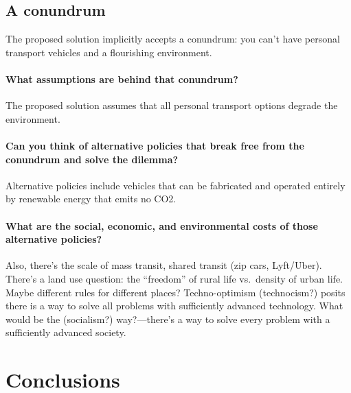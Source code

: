 \documentclass[12pt]{article}
\begin{document}
\subsection{A conundrum}
\label{sec:conundrum}

The proposed solution implicitly accepts a conundrum: 
you can't have personal transport vehicles and a flourishing environment. 

\paragraph{What assumptions are behind that conundrum?} 

The proposed solution assumes that all personal transport options degrade the environment. 

\paragraph{Can you think of alternative policies that break free from the conundrum and solve the dilemma?} 

Alternative policies include vehicles that can be fabricated and operated entirely by renewable energy that emits no CO2. 

\paragraph{What are the social, economic, and environmental costs of those alternative policies?} 



Also, there's the scale of mass transit, 
shared transit (zip cars, Lyft/Uber). 
There’s a land use question: 
the ``freedom'' of rural life vs.\ density of urban life. 
Maybe different rules for different places?
Techno-optimism (technocism?) 
posits there is a way to solve all problems with sufficiently advanced technology. 
What would be the (socialism?) way?---there's a way to solve every problem 
with a sufficiently advanced society.




\section{Conclusions}
\label{sec:conclusions}
\end{document}

